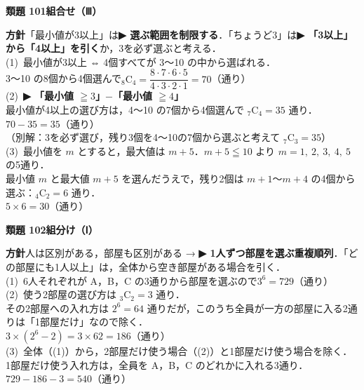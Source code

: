 \documentclass[a4paper,11pt]{ltjsarticle}
\newcommand{\ans}[2]{\Needspace{5\baselineskip}\vspace{6pt}%
  {\sffamily\bfseries 類題 #1\quad #2}\par}
\newcommand{\point}[1]{\textsf{\bfseries ▶ #1}}
\begin{document}
\ans{101}{組合せ（Ⅲ）}
\begin{kai}
\textbf{方針}\quad 「最小値が3以上」は\point{選ぶ範囲を制限する}．「ちょうど3」は\point{「3以上」から「4以上」を引く}か，3を必ず選ぶと考える．\\[2pt]
(1)\ 最小値が3以上 ⇔ 4個すべてが 3〜10 の中から選ばれる．\\
\hspace*{1.5em}3〜10 の8個から4個選んで\quad ${}_8\mathrm C_4=\dfrac{8\cdot7\cdot6\cdot5}{4\cdot3\cdot2\cdot1}=70$（通り）\\[2pt]
(2)\ \point{「最小値 $\geqq3$」$-$「最小値 $\geqq4$」}\\
\hspace*{1.5em}最小値が4以上の選び方は，4〜10 の7個から4個選んで ${}_7\mathrm C_4=35$ 通り．\\
\hspace*{1.5em}$70-35=35$（通り）\\
\hspace*{1.5em}（別解：3を必ず選び，残り3個を4〜10の7個から選ぶと考えて ${}_7\mathrm C_3=35$）\\[2pt]
(3)\ 最小値を $m$ とすると，最大値は $m+5$．$m+5\leqq10$ より $m=1,\ 2,\ 3,\ 4,\ 5$ の5通り．\\
\hspace*{1.5em}最小値 $m$ と最大値 $m+5$ を選んだうえで，残り2個は $m+1$〜$m+4$ の4個から選ぶ：${}_4\mathrm C_2=6$ 通り．\\
\hspace*{1.5em}$5\times6=30$（通り）
\end{kai}

\ans{102}{組分け（Ⅰ）}
\begin{kai}
\textbf{方針}\quad 人は区別がある，部屋も区別がある → \point{1人ずつ部屋を選ぶ重複順列}．「どの部屋にも1人以上」は，全体から空き部屋がある場合を引く．\\[2pt]
(1)\ 6人それぞれが A，B，C の3通りから部屋を選ぶので\quad $3^6=729$（通り）\\[2pt]
(2)\ 使う2部屋の選び方は ${}_3\mathrm C_2=3$ 通り．\\
\hspace*{1.5em}その2部屋への入れ方は $2^6=64$ 通りだが，このうち全員が一方の部屋に入る2通りは「1部屋だけ」なので除く．\\
\hspace*{1.5em}$3\times(2^6-2)=3\times62=186$（通り）\\[2pt]
(3)\ 全体（(1)）から，2部屋だけ使う場合（(2)）と1部屋だけ使う場合を除く．\\
\hspace*{1.5em}1部屋だけ使う入れ方は，全員を A，B，C のどれかに入れる3通り．\\
\hspace*{1.5em}$729-186-3=540$（通り）
\end{kai}
\end{document}
